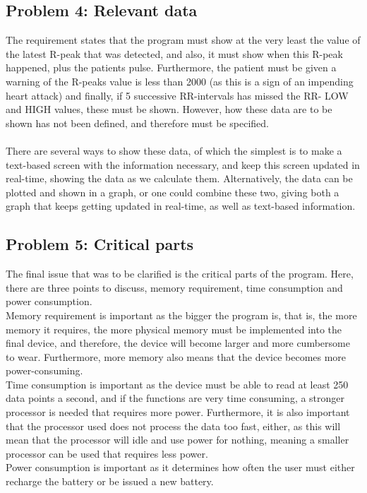 \documentclass[12pt,a4paper]{article}
\begin{document}
\subsection{Problem 4: Relevant data}
	The requirement states that the program must show at the very least the value of the latest R-peak that was detected, and also, it must show when this R-peak happened, plus the patients pulse. Furthermore, the patient must be given a warning of the R-peaks value is less than 2000 (as this is a sign of an impending heart attack) and finally, if 5 successive RR-intervals has missed the RR- LOW and HIGH values, these must be shown. However, how these data are to be shown has not been defined, and therefore must be specified.\\
	\\
	There are several ways to show these data, of which the simplest is to make a text-based screen with the information necessary, and keep this screen updated in real-time, showing the data as we calculate them. Alternatively, the data can be plotted and shown in a graph, or one could combine these two, giving both a graph that keeps getting updated in real-time, as well as text-based information.\\

\subsection{Problem 5: Critical parts}
	The final issue that was to be clarified is the critical parts of the program. Here, there are three points to discuss, memory requirement, time consumption and power consumption.\\
	Memory requirement is important as the bigger the program is, that is, the more memory it requires, the more physical memory must be implemented into the final device, and therefore, the device will become larger and more cumbersome to wear. Furthermore, more memory also means that the device becomes more power-consuming.\\
	Time consumption is important as the device must be able to read at least 250 data points a second, and if the functions are very time consuming, a stronger processor is needed that requires more power. Furthermore, it is also important that the processor used does not process the data too fast, either, as this will mean that the processor will idle and use power for nothing, meaning a smaller processor can be used that requires less power.\\
	Power consumption is important as it determines how often the user must either recharge the battery or be issued a new battery.\\
	
\end{document}
